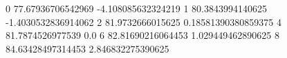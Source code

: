 0 77.67936706542969 -4.108085632324219
1 80.3843994140625 -1.4030532836914062
2 81.9732666015625 0.18581390380859375
4 81.7874526977539 0.0
6 82.81690216064453 1.029449462890625
8 84.63428497314453 2.846832275390625
